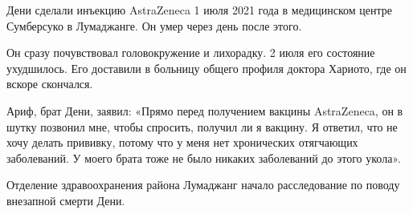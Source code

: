 Дени сделали инъекцию AstraZeneca 1 июля 2021 года в медицинском центре
Сумберсуко в Лумаджанге. Он умер через день после этого.

Он сразу почувствовал головокружение и лихорадку. 2 июля его состояние
ухудшилось. Его доставили в больницу общего профиля доктора Хариото, где он
вскоре скончался.

Ариф, брат Дени, заявил: «Прямо перед получением вакцины AstraZeneca, он в шутку
позвонил мне, чтобы спросить, получил ли я вакцину. Я ответил, что не хочу
делать прививку, потому что у меня нет хронических отягчающих заболеваний. У
моего брата тоже не было никаких заболеваний до этого укола».

Отделение здравоохранения района Лумаджанг начало расследование по поводу
внезапной смерти Дени.
